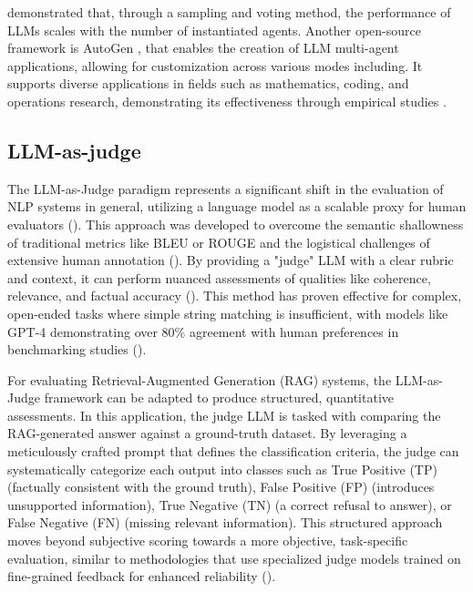             \citet{Li2024} demonstrated that, through a sampling and voting method, the performance of LLMs scales with the number of instantiated agents.
            Another open-source framework is AutoGen \citep{Wu2023}, that enables the creation of LLM multi-agent applications, allowing for customization across various modes including. It supports diverse applications in fields such as mathematics, coding, and operations research, demonstrating its effectiveness through empirical studies \citep{Wu2023}.

        \subsection{LLM-as-judge}

            The LLM-as-Judge paradigm represents a significant shift in the evaluation of NLP systems in general, utilizing a language model as a scalable proxy for human evaluators (\cite{li2024llmsasjudgescomprehensivesurveyllmbased}). This approach was developed to overcome the semantic shallowness of traditional metrics like BLEU or ROUGE and the logistical challenges of extensive human annotation (\cite{Zheng2023}). By providing a "judge" LLM with a clear rubric and context, it can perform nuanced assessments of qualities like coherence, relevance, and factual accuracy (\cite{li2024llmsasjudgescomprehensivesurveyllmbased}). This method has proven effective for complex, open-ended tasks where simple string matching is insufficient, with models like GPT-4 demonstrating over 80\% agreement with human preferences in benchmarking studies (\cite{Zheng2023}).

            For evaluating Retrieval-Augmented Generation (RAG) systems, the LLM-as-Judge framework can be adapted to produce structured, quantitative assessments. In this application, the judge LLM is tasked with comparing the RAG-generated answer against a ground-truth dataset. By leveraging a meticulously crafted prompt that defines the classification criteria, the judge can systematically categorize each output into classes such as True Positive (TP) (factually consistent with the ground truth), False Positive (FP) (introduces unsupported information), True Negative (TN) (a correct refusal to answer), or False Negative (FN) (missing relevant information). This structured approach moves beyond subjective scoring towards a more objective, task-specific evaluation, similar to methodologies that use specialized judge models trained on fine-grained feedback for enhanced reliability (\cite{Kim2024}).

